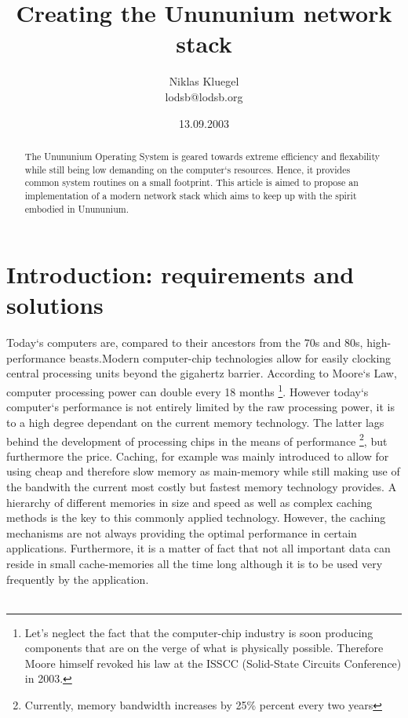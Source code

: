 \documentclass[11pt,a4paper]{article}
\begin{document}
\title{Creating the Unununium network stack}
\author{Niklas Kluegel \\ lodsb@lodsb.org}
\date{13.09.2003}
\maketitle
\begin{abstract}
The Unununium Operating System is geared towards extreme efficiency and flexability while still being low demanding on the computer`s resources. Hence, it provides common system routines on a small footprint. This article is aimed to propose 
an implementation of a modern network stack which aims to keep up with the spirit embodied in Unununium.
\end{abstract}
\newpage
\tableofcontents
\newpage
\section{Introduction: requirements and solutions}
Today`s computers are, compared to their ancestors from the 70s and 80s, high-performance beasts.Modern computer-chip technologies allow for easily clocking central processing units beyond the gigahertz barrier. According to Moore`s Law, computer processing power can double every 18 months 
\footnote {Let's neglect the fact that the computer-chip industry is soon producing components that are on the verge of what is physically possible. Therefore Moore himself revoked his law at the ISSCC (Solid-State Circuits Conference) in 2003.}. However today`s computer`s performance is not entirely limited by the raw processing power, it is to a high degree dependant on the current memory technology. The latter lags behind the development of processing chips in the means of performance
\footnote {Currently, memory bandwidth increases by 25\% percent every two years}, but furthermore the price. Caching, for example was mainly introduced to allow for using cheap and therefore slow memory as main-memory while still making use of the bandwith the current most costly but fastest memory technology provides. A 
hierarchy of different memories in size and speed as well as complex caching methods is the key to this
commonly applied technology. However, the caching mechanisms are not always providing the optimal performance in certain applications. Furthermore, it is a matter of fact that not all important data can reside in small cache-memories all the time long although it is to be used very frequently by the application.
\\\\
\end{document}
